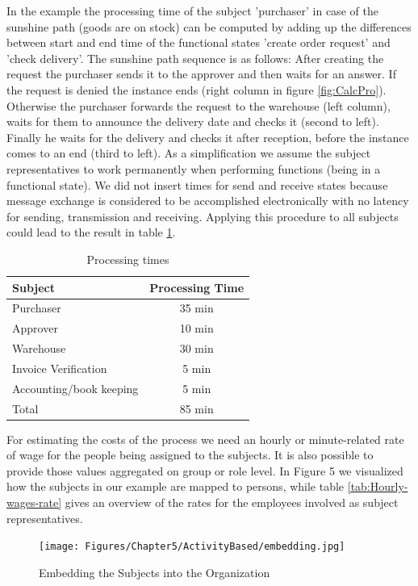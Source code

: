 In the example the processing time of the subject 'purchaser' in case of the sunshine path (goods are on stock) can be computed by adding up the differences between start and end time of the functional states 'create order request' and 'check delivery'. The sunshine path sequence is as follows: After creating the request the purchaser sends it to the approver and then waits for an answer. If the request is denied the instance ends (right column in figure \ref{fig:CalcPro}). Otherwise the purchaser forwards the request to the warehouse (left column), waits for them to announce the delivery date and checks it (second to left). Finally he waits for the delivery and checks it after reception, before the instance comes to an end (third to left). As a simplification we assume the subject representatives to work permanently when performing functions (being in a functional state). We did not insert times for send and receive states because message exchange is considered to be accomplished electronically with no latency for sending, transmission and receiving. Applying this procedure to all subjects could lead to the result in table \ref{tab:procTime}.

\begin{table}[htbp]
	\centering
\begin{tabular}{|p{5.0 cm } |c|}
\hline
	\textbf{Subject} & Processing Time \\
	\hline
	\hline
	Purchaser & 35 min\\
	\hline
	Approver & 10 min \\
	\hline
	Warehouse & 30 min \\
	\hline
	Invoice Verification & 5 min \\
	\hline
	Accounting/book keeping & 5 min \\
	\hline
	Total & 85 min \\
	\hline
\end{tabular}
\caption{Processing times}
\label{tab:procTime}
\end{table}

For estimating the costs of the process we need an hourly or minute-related rate of wage for the people being assigned to the subjects. It is also possible to provide those values aggregated on group or role level. In Figure 5 we visualized how the subjects in our example are mapped to persons, while table \ref{tab:Hourly-wages-rate} gives an overview of the rates for the employees involved as subject representatives.

\begin{figure}[htbp]
	\centering
	\texttt{[image: Figures/Chapter5/ActivityBased/embedding.jpg]}
	\caption[Embedding the Subjects into the Organization]{Embedding the Subjects into the Organization}
	\label{fig:Embedding}
\end{figure}

